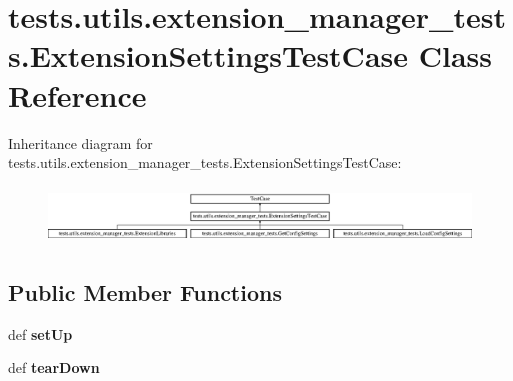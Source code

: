 \hypertarget{classtests_1_1utils_1_1extension__manager__tests_1_1ExtensionSettingsTestCase}{\section{tests.\-utils.\-extension\-\_\-manager\-\_\-tests.\-Extension\-Settings\-Test\-Case Class Reference}
\label{classtests_1_1utils_1_1extension__manager__tests_1_1ExtensionSettingsTestCase}
}
Inheritance diagram for tests.\-utils.\-extension\-\_\-manager\-\_\-tests.\-Extension\-Settings\-Test\-Case\-:\begin{figure}[H]
\begin{center}
\leavevmode
\includegraphics[height=1.513514cm]{classtests_1_1utils_1_1extension__manager__tests_1_1ExtensionSettingsTestCase}
\end{center}
\end{figure}
\subsection*{Public Member Functions}
\begin{DoxyCompactItemize}
\item 
\hypertarget{classtests_1_1utils_1_1extension__manager__tests_1_1ExtensionSettingsTestCase_ada7b1ab0d0fe85c3a38392c0305aa3a5}{def {\bfseries set\-Up}}\label{classtests_1_1utils_1_1extension__manager__tests_1_1ExtensionSettingsTestCase_ada7b1ab0d0fe85c3a38392c0305aa3a5}

\item 
\hypertarget{classtests_1_1utils_1_1extension__manager__tests_1_1ExtensionSettingsTestCase_a16facc5e00ba98e9410c3e8d2c42bb89}{def {\bfseries tear\-Down}}\label{classtests_1_1utils_1_1extension__manager__tests_1_1ExtensionSettingsTestCase_a16facc5e00ba98e9410c3e8d2c42bb89}

\end{DoxyCompactItemize}
